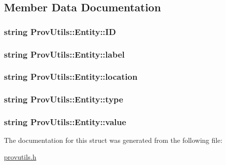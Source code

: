 \subsection{Member Data Documentation}
\hypertarget{struct_prov_utils_1_1_entity_adbf2382ee1ccd90946c2dd78071a5593}{
\subsubsection[{I\-D}]{\setlength{\rightskip}{0pt plus 5cm}string Prov\-Utils\-::\-Entity\-::\-I\-D}}\label{struct_prov_utils_1_1_entity_adbf2382ee1ccd90946c2dd78071a5593}
\hypertarget{struct_prov_utils_1_1_entity_a1da24da5a6989c2ac22f5fd3464ffbc2}{
\subsubsection[{label}]{\setlength{\rightskip}{0pt plus 5cm}string Prov\-Utils\-::\-Entity\-::label}}\label{struct_prov_utils_1_1_entity_a1da24da5a6989c2ac22f5fd3464ffbc2}
\hypertarget{struct_prov_utils_1_1_entity_ac2670e0260f3ff358475f9758af9eafe}{
\subsubsection[{location}]{\setlength{\rightskip}{0pt plus 5cm}string Prov\-Utils\-::\-Entity\-::location}}\label{struct_prov_utils_1_1_entity_ac2670e0260f3ff358475f9758af9eafe}
\hypertarget{struct_prov_utils_1_1_entity_aaf7eb08fca6dddb2534ff34124a9b69c}{
\subsubsection[{type}]{\setlength{\rightskip}{0pt plus 5cm}string Prov\-Utils\-::\-Entity\-::type}}\label{struct_prov_utils_1_1_entity_aaf7eb08fca6dddb2534ff34124a9b69c}
\hypertarget{struct_prov_utils_1_1_entity_ad2f99bb0a93f48d801f9f425ecedfcce}{
\subsubsection[{value}]{\setlength{\rightskip}{0pt plus 5cm}string Prov\-Utils\-::\-Entity\-::value}}\label{struct_prov_utils_1_1_entity_ad2f99bb0a93f48d801f9f425ecedfcce}


The documentation for this struct was generated from the following file\-:\begin{DoxyCompactItemize}
\item 
\hyperlink{provutils_8h}{provutils.\-h}\end{DoxyCompactItemize}
